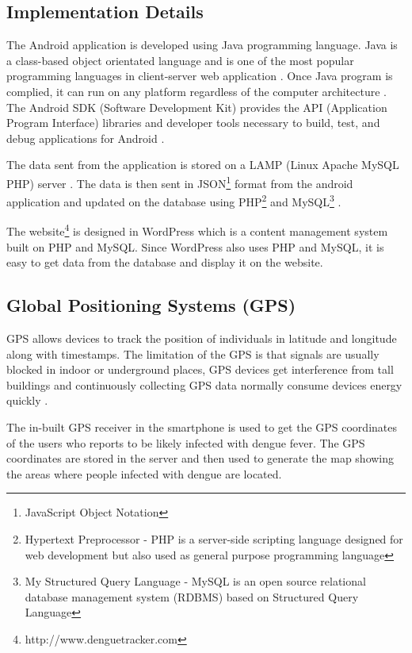 \documentclass[runningheads,a4paper]{llncs}
\begin{document}
\subsection{Implementation Details}
The Android application is developed using Java programming language. Java is a class-based object orientated language and is one of the most popular programming languages in client-server web application \cite{TechHuddle}. Once Java program is complied, it can run on any platform regardless of the computer architecture \cite{OracleJava}. The Android SDK (Software Development Kit) provides the API (Application Program Interface) libraries and developer tools necessary to build, test, and debug applications for Android \cite{Android}.

The data sent from the application is stored on a LAMP (Linux Apache MySQL PHP) server \cite{Linus2014}. The data is then sent in JSON\footnote{JavaScript Object Notation} format \cite{Json2014} from the android application and updated on the database using PHP\footnote{Hypertext Preprocessor - PHP is a server-side scripting language designed for web development but also used as general purpose programming language} and MySQL\footnote{My Structured Query Language - MySQL is an open source relational database management system (RDBMS) based on Structured Query Language}  \cite{Oracle2014}.

The website\footnote{http://www.denguetracker.com} is designed in WordPress \cite{Wordpress2014} which is a content management system built on PHP and MySQL. Since WordPress also uses PHP and MySQL, it is easy to get data from the database and display it on the website.

\subsection{Global Positioning Systems (GPS)}
GPS allows devices to track the position of individuals in latitude and longitude along with timestamps. The limitation of the GPS is that signals are usually blocked in indoor or underground places, GPS devices get interference from tall buildings and continuously collecting GPS data normally consume devices energy quickly \cite{Lin2013}.

The in-built GPS receiver in the smartphone is used to get the GPS coordinates of the users who reports to be likely infected with dengue fever. The GPS coordinates are stored in the server and then used to generate the map showing the areas where people infected with dengue are located.
\end{document}
